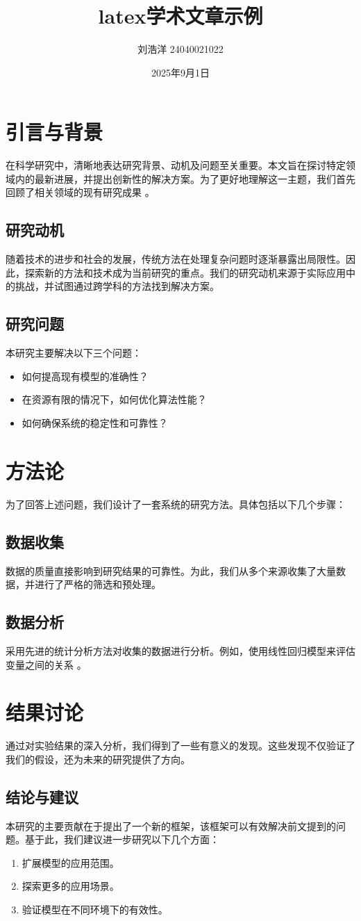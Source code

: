 \documentclass{article}
\title{latex学术文章示例}
\author{刘浩洋 24040021022}
\date{2025年9月1日}
\begin{document}
\maketitle

\section{引言与背景}
在科学研究中，清晰地表达研究背景、动机及问题至关重要。本文旨在探讨特定领域内的最新进展，并提出创新性的解决方案。为了更好地理解这一主题，我们首先回顾了相关领域的现有研究成果 \cite{knuth1984}。

\subsection{研究动机}
随着技术的进步和社会的发展，传统方法在处理复杂问题时逐渐暴露出局限性。因此，探索新的方法和技术成为当前研究的重点。我们的研究动机来源于实际应用中的挑战，并试图通过跨学科的方法找到解决方案。

\subsection{研究问题}
本研究主要解决以下三个问题：
\begin{itemize}
    \item 如何提高现有模型的准确性？
    \item 在资源有限的情况下，如何优化算法性能？
    \item 如何确保系统的稳定性和可靠性？
\end{itemize}

\section{方法论}
为了回答上述问题，我们设计了一套系统的研究方法。具体包括以下几个步骤：

\subsection{数据收集}
数据的质量直接影响到研究结果的可靠性。为此，我们从多个来源收集了大量数据，并进行了严格的筛选和预处理。

\subsection{数据分析}
采用先进的统计分析方法对收集的数据进行分析。例如，使用线性回归模型来评估变量之间的关系 \cite{lamport1994}。

\section{结果讨论}
通过对实验结果的深入分析，我们得到了一些有意义的发现。这些发现不仅验证了我们的假设，还为未来的研究提供了方向。

\subsection{结论与建议}
本研究的主要贡献在于提出了一个新的框架，该框架可以有效解决前文提到的问题。基于此，我们建议进一步研究以下几个方面：
\begin{enumerate}
    \item 扩展模型的应用范围。
    \item 探索更多的应用场景。
    \item 验证模型在不同环境下的有效性。
\end{enumerate}



\end{document}
